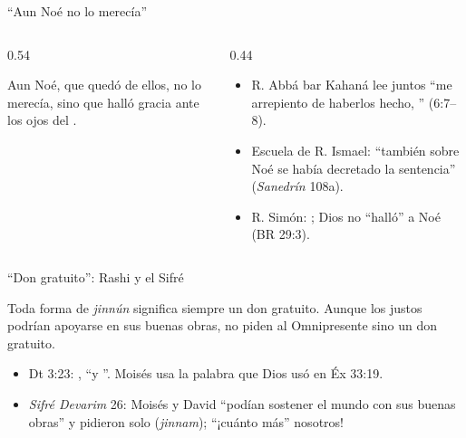 \begin{frame}{``Aun Noé no lo merecía''}
\begin{columns}[t,onlytextwidth]
\begin{column}{0.54\textwidth}
\centering{}\par{}
\begin{cita}Aun Noé, que quedó de ellos, no lo merecía, sino que halló gracia ante los ojos del \SENOR.\end{cita}
\end{column}
\begin{column}{0.44\textwidth}\small\RaggedRight
\begin{itemize}
\item R. Abbá bar Kahaná lee juntos ``me arrepiento de haberlos hecho, '' (6:7--8).
\item Escuela de R. Ismael: ``también sobre Noé se había decretado la sentencia'' (\emph{Sanedrín} 108a).
\item R. Simón: ; Dios no ``halló'' a Noé (BR 29:3).
\end{itemize}
\end{column}
\end{columns}
\end{frame}

\begin{frame}{``Don gratuito'': Rashi y el Sifré}
\centering{}
\begin{cita}Toda forma de \emph{jinnún} significa siempre un don gratuito. Aunque los justos podrían apoyarse en sus buenas obras, no piden al Omnipresente sino un don gratuito.\end{cita}
\small\RaggedRight
\begin{itemize}
\item Dt 3:23: , ``y ''. Moisés usa la palabra que Dios usó en Éx 33:19.
\item \emph{Sifré Devarim} 26: Moisés y David ``podían sostener el mundo con sus buenas obras'' y pidieron solo  (\emph{jinnam}); ``¡cuánto más'' nosotros!
\end{itemize}
\end{frame}

